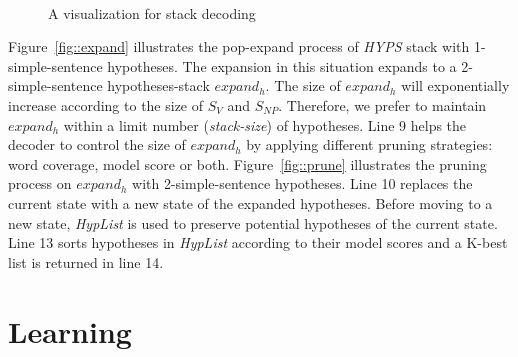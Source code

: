 \documentclass[10pt]{article}
\begin{document}
\begin{figure}[ht]%
\centering
{}\\
\caption{A visualization for stack decoding}
\end{figure}

Figure~\ref{fig::expand} illustrates the pop-expand process of \textit{HYPS} stack with 1-simple-sentence hypotheses.
The expansion in this situation expands to a 2-simple-sentence hypotheses-stack $expand_h$.
The size of $expand_h$ will exponentially increase according to the size of $S_V$ and $S_{NP}$.
Therefore, we prefer to maintain $expand_h$ within a limit number (\textit{stack-size}) of hypotheses.
Line 9 helps the decoder to control the size of $expand_h$ by applying different pruning strategies: word coverage, model score or both.
Figure~\ref{fig::prune} illustrates the pruning process on $expand_h$ with 2-simple-sentence hypotheses.
Line 10 replaces the current state with a new state of the expanded hypotheses.
Before moving to a new state, \textit{HypList} is used to preserve potential hypotheses of the current state.
Line 13 sorts hypotheses in \textit{HypList} according to their model scores and a K-best list is returned in line 14.

\section{Learning}
\label{sec:Learning}
\end{document}
